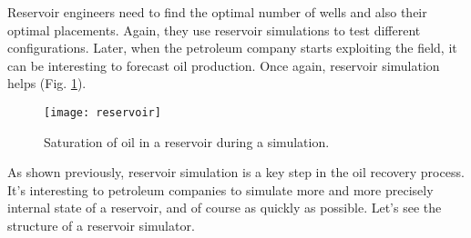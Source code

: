 Reservoir engineers need to find the optimal number of wells and also their optimal placements.
%
Again, they use reservoir simulations to test different configurations.
%
Later, when the petroleum company starts exploiting the field, it can be interesting to forecast oil production.
%
Once again, reservoir simulation helps (Fig. \ref{fig:floviz}).

\begin{figure}[!ht]
  \centering
  \texttt{[image: reservoir]}
  \caption{Saturation of oil in a reservoir during a simulation.}
\label{fig:floviz}
\end{figure}


As shown previously, reservoir simulation is a key step in the oil recovery process.
%
It's interesting to petroleum companies to simulate more and more precisely internal state of a reservoir, and of course as quickly as possible.
%
Let's see the structure of a reservoir simulator.
